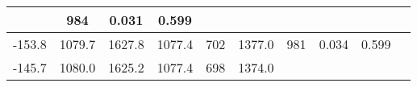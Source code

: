 \documentclass[a4paper,10pt]{article}
\begin{document}
\begin{longtable}{
     |
%    
    c|
%    
    c|
%    
    c|
%    
    c|
%    
    c|
%    
    c|
%    
    c|
%    
    c|
%    
    c|
%    
    c|
%    
    }
%        
        & 984
%        

%        

%        
        & 0.031
%        

%        

%        
        & 0.599
%        

%        
        \\
        \hline

        

%        

%        
        -153.8
%        

%        

%        
        & 1079.7
%        

%        

%        
        & 1627.8
%        

%        

%        
        & 1077.4
%        

%        

%        
        & 702
%        

%        

%        
        & 1377.0
%        

%        

%        
        & 981
%        

%        

%        
        & 0.034
%        

%        

%        
        & 0.599
%        

%        
        \\
        \hline

        

%        

%        
        -145.7
%        

%        

%        
        & 1080.0
%        

%        

%        
        & 1625.2
%        

%        

%        
        & 1077.4
%        

%        

%        
        & 698
%        

%        

%        
        & 1374.0
%        

%        


\end{longtable}
\end{document}
